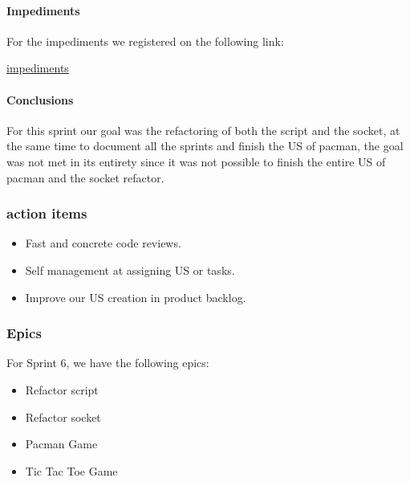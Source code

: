 \paragraph{Impediments}
For the impediments we registered on the following link:

\href{https://docs.google.com/spreadsheets/d/16zbS6L_JsIA9JhoJ1_e8Luk3MzKs8KApNbeizERjYn0/edit?usp=sharing}{impediments}

\paragraph{Conclusions}
For this sprint our goal was the refactoring of both the script and the socket, at the same time to document all the sprints and finish the US of pacman, the goal was not met in its entirety since it was not possible to finish the entire US of pacman and the socket refactor. 

\subsubsection{action items}

\begin{itemize}
    \item Fast and concrete code reviews.
    \item Self management at assigning US or tasks.
    \item Improve our US creation in product backlog.
\end{itemize}


\subsubsection{Epics}

For Sprint 6, we have the following epics:

\begin{itemize}
    \item Refactor script
    \item Refactor socket
    \item Pacman Game
    \item Tic Tac Toe Game
\end{itemize}